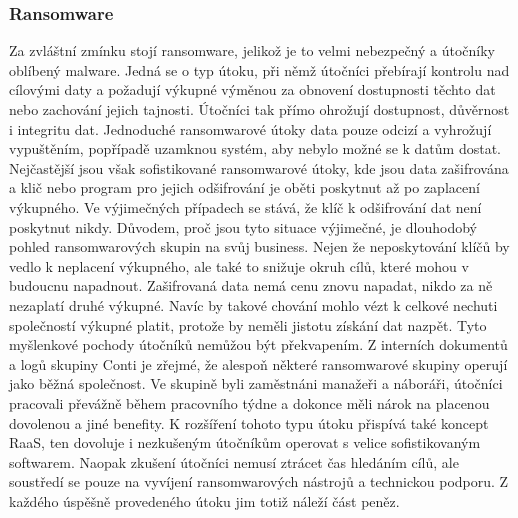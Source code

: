 \subsubsection{Ransomware}
Za zvláštní zmínku stojí ransomware, jelikož je to velmi nebezpečný a útočníky oblíbený malware.
Jedná se o typ útoku, při němž útočníci přebírají kontrolu nad cílovými daty a požadují výkupné výměnou za obnovení dostupnosti těchto dat nebo zachování jejich tajnosti.
Útočníci tak přímo ohrožují dostupnost, důvěrnost i integritu dat.
Jednoduché ransomwarové útoky data pouze odcizí a vyhrožují vypuštěním, popřípadě uzamknou systém, aby nebylo možné se k datům dostat.
Nejčastější jsou však sofistikované ransomwarové útoky, kde jsou data zašifrována a klič nebo program pro jejich odšifrování je oběti poskytnut až po zaplacení výkupného.
Ve výjimečných případech se stává, že klíč k odšifrování dat není poskytnut nikdy.
Důvodem, proč jsou tyto situace výjimečné, je dlouhodobý pohled ransomwarových skupin na svůj business.
Nejen že neposkytování klíčů by vedlo k neplacení výkupného, ale také to snižuje okruh cílů, které mohou v budoucnu napadnout.
Zašifrovaná data nemá cenu znovu napadat, nikdo za ně nezaplatí druhé výkupné.
Navíc by takové chování mohlo vézt k celkové nechuti společností výkupné platit, protože by neměli jistotu získání dat nazpět.
Tyto myšlenkové pochody útočníků nemůžou být překvapením.
Z interních dokumentů a logů skupiny Conti je zřejmé, že alespoň některé ransomwarové skupiny operují jako běžná společnost\cite{Conti_logs}.
Ve skupině byli zaměstnáni manažeři a náboráři, útočníci pracovali převážně během pracovního týdne a dokonce měli nárok na placenou dovolenou a jiné benefity.
K rozšíření tohoto typu útoku přispívá také koncept \ac{RaaS}, ten dovoluje i nezkušeným útočníkům operovat s velice sofistikovaným softwarem.
Naopak zkušení útočníci nemusí ztrácet čas hledáním cílů, ale soustředí se pouze na vyvíjení ransomwarových nástrojů a technickou podporu.
Z každého úspěšně provedeného útoku jim totiž náleží část peněz.\cite{Enisa_thread_landscape}


